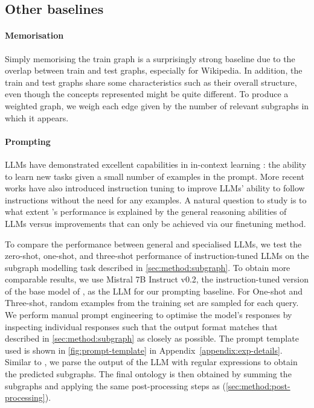 \subsection{Other baselines}

\paragraph{Memorisation}
Simply memorising the train graph is a surprisingly strong baseline due to the overlap between train and test graphs, especially for Wikipedia. In addition, the train and test graphs share some characteristics such as their overall structure, even though the concepts represented might be quite different. To produce a weighted graph, we weigh each edge given by the number of relevant subgraphs in which it appears.

\paragraph{Prompting}

LLMs have demonstrated excellent capabilities in in-context learning \cite{brown2020language}: the ability to learn new tasks given a small number of examples in the prompt. More recent works have also introduced instruction tuning \cite{ouyang2022training,rafailov2024direct} to improve LLMs' ability to follow instructions without the need for any examples. A natural question to study is to what extent \name's performance is explained by the general reasoning abilities of LLMs versus improvements that can only be achieved via our finetuning method.

To compare the performance between general and specialised LLMs, we test the zero-shot, one-shot, and three-shot performance of instruction-tuned LLMs on the subgraph modelling task described in \cref{sec:method:subgraph}. To obtain more comparable results, we use Mistral 7B Instruct v0.2, the instruction-tuned version of the base model of \name, as the LLM for our prompting baseline. For One-shot and Three-shot, random examples from the training set are sampled for each query. We perform manual prompt engineering to optimise the model's responses by inspecting individual responses such that the output format matches that described in \cref{sec:method:subgraph} as closely as possible. The prompt template used is shown in \cref{fig:prompt-template} in Appendix~\ref{appendix:exp-details}. Similar to \name, we parse the output of the LLM with regular expressions to obtain the predicted subgraphs. The final ontology is then obtained by summing the subgraphs and applying the same post-processing steps as \name (\cref{sec:method:post-processing}).

